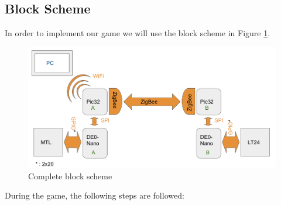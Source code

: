 \documentclass[10pt,a4paper]{article}
\begin{document}
\subsection{Block Scheme}
    In order to implement our game we will use the block scheme in Figure  \ref{Block}. \\
    \begin{figure}[h!]
        \centering
        \includegraphics[width = 0.8 \textwidth]{lol3.png}
        \caption{Complete block scheme \label{Block}}
    \end{figure}
    During the game, the following steps are followed:
\end{document}
